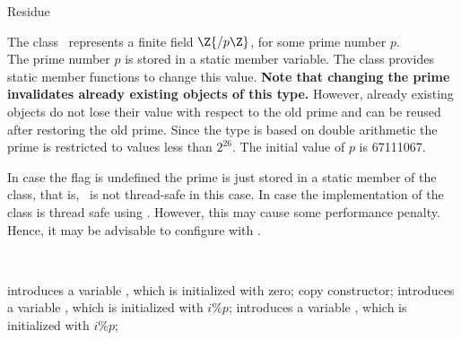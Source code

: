 \begin{ccRefClass} {Residue}
\label{Residue}

\def\ccTagOperatorLayout{\ccTrue}

\ccDefinition

The class \ccRefName\ represents a finite field $\Z{/p\Z}$, 
for some prime number $p$. \\

The prime number $p$ is stored in a static member variable. 
The class provides static member functions to change this value. 
{\bf Note that changing the prime invalidates already existing objects 
of this type.}
However, already existing objects do not lose their value with respect to the 
old prime and can be reused after restoring the old prime. 
Since the type is based on double 
arithmetic the prime is restricted to values less than $2^{26}$. 
The initial value of $p$ is 67111067. 

In case the flag  
is undefined the prime is just stored in a static member 
of the class, that is, \ccRefName\ is not thread-safe in this case.  
In case 
the implementation of the class is thread safe using 
. However, this may cause some performance 
penalty. Hence, it may be advisable to configure  with 
. 


\ccIsModel
{}\\


\ccCreation
{}

{introduces a variable \ccVar, which is initialized with zero;}
\ccGlue
{}
{copy constructor;}
\ccGlue
{}
{introduces a variable \ccVar, which is initialized with $i \%  p$;}
\ccGlue
{}
{introduces a variable \ccVar, which is initialized with $i \%  p$;}

\ccOperations

\ccGlue
{}
\ccGlue
{}



\end{ccRefClass}
